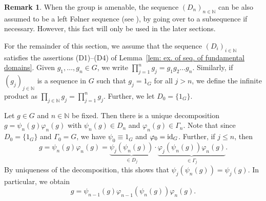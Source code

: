 \documentclass[titlepage,reqno,10pt]{amsart}
\theoremstyle{definition}
\newtheorem{remark}[theorem]{Remark}
\def\N{{\mathbb N}}
\def \id {{\rm id}}
\begin{document}
  \begin{remark}\label{rem: D_n Folner if G amenable}
      When the group is amenable, the  sequence $(D_n)_{n\in \mathbb{N}}$ can be also assumed to be a left F\o lner sequence (see \cite[Lemma 5]{CoPe14}), by going over to a subsequence if necessary. However, this fact will only be used in the later sections. 
  \end{remark}
  For the remainder of this section, we assume that the sequence $(D_i)_{i\in \mathbb{N}}$ satisfies the assertions  (D1)--(D4) of Lemma~\ref{lem: ex. of seq. of fundamental domains}. Given $g_1,\ldots,g_n\in G$, we write $\prod_{j=1}^n g_j = g_1 g_2\ldots g_n$. Similarly, if $(g_j)_{j\in\N}$ is a sequence in $G$ such that $g_j=1_G$ for all $j>n$, we define the infinite product as $\prod_{j\in\N} g_j = \prod_{j=1}^n g_j$. Further, we let $D_0=\{1_G\}$. \medskip
  
Let $g\in G$ and $n\in \N$ be fixed.
Then there is a unique decomposition $g = \psi_n(g)\varphi_n(g)$ with $\psi_n(g)\in D_n$ and $\varphi_n(g)\in \Gamma_n$. Note that since $D_0=\{1_G\}$ and $\Gamma_0=G$, we have $\psi_0\equiv 1_G$ and $\varphi_0=\id_G$. Further, if $j\leq n$, then 
\begin{equation} \label{eq: expansion basic step} g = \psi_n(g)\varphi_n(g) =\underbrace{\psi_j(\psi_n(g))}_{\in D_j}\cdot \underbrace{ \varphi_j(\psi_n(g))\varphi_n(g)}_{\in \Gamma_j}.
\end{equation}
By uniqueness of the decomposition, this shows that $\psi_j(\psi_n(g)) = \psi_j(g)$.
In particular, we obtain $$g =\psi_{n-1}(g)  \varphi_{n-1}(\psi_n(g)) \varphi_n(g).$$
\end{document}
